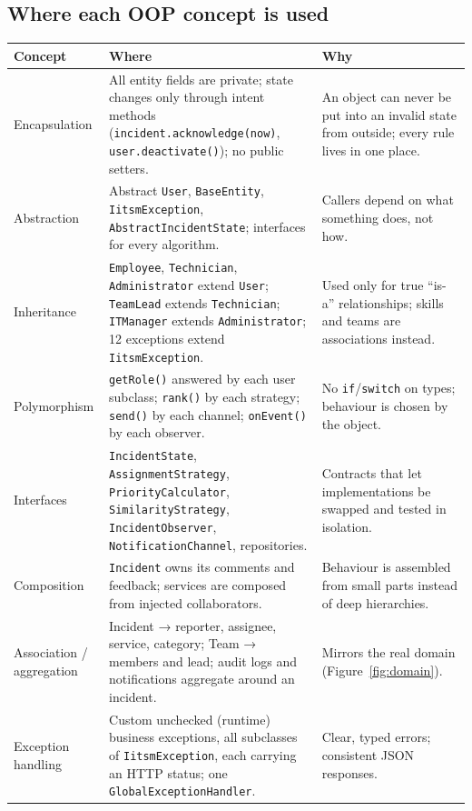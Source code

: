 \documentclass[11pt,a4paper]{article}
\begin{document}
\subsection{Where each OOP concept is used}
\begin{longtable}{@{}L{2.8cm}L{6.7cm}L{6.1cm}@{}}
\toprule
\textbf{Concept} & \textbf{Where} & \textbf{Why} \\ \midrule \endhead
Encapsulation & All entity fields are private; state changes only through intent methods (\texttt{incident.acknowledge(now)}, \texttt{user.deactivate()}); no public setters. & An object can never be put into an invalid state from outside; every rule lives in one place. \\
Abstraction & Abstract \texttt{User}, \texttt{BaseEntity}, \texttt{IitsmException}, \texttt{AbstractIncidentState}; interfaces for every algorithm. & Callers depend on what something does, not how. \\
Inheritance & \texttt{Employee}, \texttt{Technician}, \texttt{Administrator} extend \texttt{User}; \texttt{TeamLead} extends \texttt{Technician}; \texttt{ITManager} extends \texttt{Administrator}; 12 exceptions extend \texttt{IitsmException}. & Used only for true “is-a” relationships; skills and teams are associations instead. \\
Polymorphism & \texttt{getRole()} answered by each user subclass; \texttt{rank()} by each strategy; \texttt{send()} by each channel; \texttt{onEvent()} by each observer. & No \texttt{if}/\texttt{switch} on types; behaviour is chosen by the object. \\
Interfaces & \texttt{IncidentState}, \texttt{AssignmentStrategy}, \texttt{PriorityCalculator}, \texttt{SimilarityStrategy}, \texttt{IncidentObserver}, \texttt{NotificationChannel}, repositories. & Contracts that let implementations be swapped and tested in isolation. \\
Composition & \texttt{Incident} owns its comments and feedback; services are composed from injected collaborators. & Behaviour is assembled from small parts instead of deep hierarchies. \\
Association / aggregation & Incident → reporter, assignee, service, category; Team → members and lead; audit logs and notifications aggregate around an incident. & Mirrors the real domain (Figure~\ref{fig:domain}). \\
Exception handling & Custom unchecked (runtime) business exceptions, all subclasses of \texttt{IitsmException}, each carrying an HTTP status; one \texttt{GlobalExceptionHandler}. & Clear, typed errors; consistent JSON responses. \\

\end{longtable}
\end{document}
